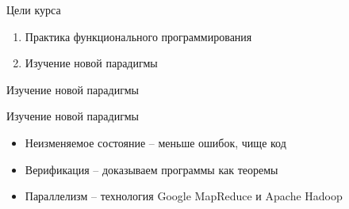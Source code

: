\documentclass{beamer}
\begin{document}
\begin{frame}{Цели курса}
  \begin{enumerate}
  \item Практика функционального программирования
  \item Изучение новой парадигмы
  \end{enumerate}
\end{frame}

\begin{frame}[fragile]{Изучение новой парадигмы}  
  \begin{minipage}[t]{0.49\linewidth}
    \begin{center}
            
    \end{center}
  \end{minipage}
  \begin{minipage}[t]{0.49\linewidth}
    \begin{center}
      
    \end{center}
  \end{minipage}
\end{frame}

\begin{frame}{Изучение новой парадигмы}
  \begin{itemize}
  \item Неизменяемое состояние -- меньше ошибок, чище код\pause
  \item Верификация -- доказываем программы как теоремы\pause
  \item Параллелизм -- технология Google MapReduce и Apache Hadoop
  \end{itemize}
\end{frame}
\end{document}
